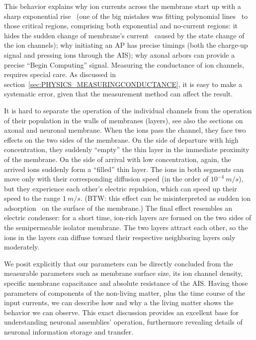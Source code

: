 This behavior explains why ion currents across the membrane
start up with a sharp exponential rise~\cite{SodiumCurrentDelay:2006}
(one of the big mistakes was fitting polynomial lines~\cite{HodgkinHuxley:1952}
to those critical regions, comprising both exponential and no-current regions: it hides the sudden change of membrane's current~\cite{SodiumCurrentDelay:2006}
caused by the state change of the ion channels); why initiating an
AP has precise timings (both the charge-up signal and pressing
ions through the \gls{AIS}); why axonal arbors can provide a precise
``Begin Computing'' signal. 
Measuring the conductance of ion channels, requires special care.
As discussed in section~\ref{sec:PHYSICS_MEASURINGCONDUCTANCE}, it is easy to
make a systematic error, given that the measurement method can affect the result. 


It is hard to separate the operation of the individual channels
from the operation of their population in the walls of membranes (layers), see also the sections on axonal and neuronal membrane.
When the ions
pass the channel, they face two effects on the two sides of the membrane.
On the side of departure with high concentration, they suddenly ``empty''
the thin layer in the immediate proximity of the membrane. On the side of arrival with low concentration,
again, the arrived ions suddenly form a ``filled'' thin layer.  
The ions in both segments can move only with their corresponding diffusion speed 
(in the order of $10^{-4}\ m/s$), but they experience each other's electric repulsion, which can speed up their speed to the range $1\ m/s$. 
(BTW: this effect can be misinterpreted
as sudden ion adsorption~\cite{Hodgkin-HuxleyAdsorption:2021} on
the surface of the membrane.) The final effect resembles an electric condenser:
for a short time, ion-rich layers are formed on the two sides
of the semipermeable isolator membrane.
The two layers
attract each other, so the ions in the layers can diffuse toward their respective neighboring layers 
only moderately. 

We posit explicitly that our parameters can be directly concluded from the measurable parameters
such as membrane surface size,
its ion channel density, specific membrane capacitance and absolute resistance of the \gls{AIS}.
Having
those parameters of components of the non-living matter, plus the time course of the input currents, we can describe how and why a the living matter shows the behavior we can observe. This exact discussion provides an excellent base for understanding neuronal assemblies' operation, furthermore revealing details of neuronal information storage and transfer.



